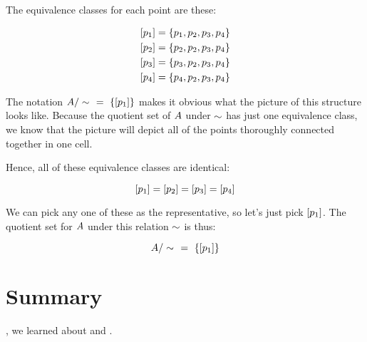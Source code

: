 \documentclass[../../../main.tex]{subfiles}
\begin{document}
\begin{example}
The equivalence classes for each point are these:

\begin{align*}
  \equivclass{p_{1}} &= \{ p_{1}, p_{2}, p_{3}, p_{4} \} \\
  \equivclass{p_{2}} &= \{ p_{2}, p_{2}, p_{3}, p_{4} \} \\
  \equivclass{p_{3}} &= \{ p_{3}, p_{2}, p_{3}, p_{4} \} \\
  \equivclass{p_{4}} &= \{ p_{4}, p_{2}, p_{3}, p_{4} \}
\end{align*}

\begin{aside}
  \begin{remark}
    The notation $\quotientset{\set{A}}{\equivalence/}~~=~\{ \equivclass{p_{1}} \}$ makes it obvious what the picture of this structure looks like. Because the quotient set of $A$ under $\equivalence/$ has just one equivalence class, we know that the picture will depict all of the points thoroughly connected together in one cell.
  \end{remark}
\end{aside}

Hence, all of these equivalence classes are identical:

\begin{equation*}
  [p_{1}] = [p_{2}] = [p_{3}] = [p_{4}]
\end{equation*}

We can pick any one of these as the representative, so let's just pick $[p_{1}]$. The quotient set for $A$ under this relation $\equivalence/$ is thus:

\begin{equation*}
  \quotientset{\set{A}}{\equivalence/}~~=~\{ \equivclass{p_{1}} \}
\end{equation*}

\end{example}



\section{Summary}

, we learned about  and .
\end{document}
